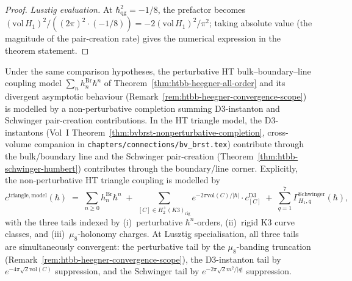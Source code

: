 \begin{proof}
\emph{Lusztig evaluation.} At $\hbar_{\mathrm{qg}}^2 = -1/8$, the
prefactor becomes $(\mathrm{vol}\,H_1)^2/((2\pi)^2\cdot(-1/8)) =
-2(\mathrm{vol}\,H_1)^2/\pi^2$; taking absolute value (the magnitude
of the pair-creation rate) gives the numerical expression in the
theorem statement.
\end{proof}

\begin{remark}
\label{rem:htbb-nonpert-triangle}
Under the same comparison hypotheses, the perturbative HT
bulk--boundary--line coupling model
$\sum_n h_n^{\mathrm{Br}}\hbar^n$ of
Theorem~\ref{thm:htbb-heegner-all-order} and its divergent asymptotic
behaviour (Remark~\ref{rem:htbb-heegner-convergence-scope}) is
modelled by a non-perturbative completion summing D$3$-instanton and
Schwinger pair-creation contributions. In the HT triangle model, the
D$3$-instantons (Vol~I
Theorem~\ref{thm:bvbrst-nonperturbative-completion},
cross-volume companion in
\texttt{chapters/connections/bv\_brst.tex}) contribute through the
bulk/boundary line and the Schwinger pair-creation
(Theorem~\ref{thm:htbb-schwinger-humbert}) contributes through the
boundary/line corner. Explicitly, the non-perturbative HT triangle
coupling is modelled by
\begin{equation}\label{eq:htbb-nonpert-triangle}
 c^{\mathrm{triangle, model}}(\hbar)
 \;=\; \sum_{n\geq 0}h_n^{\mathrm{Br}}\hbar^n
 \;+\;\!\!\sum_{[C]\in H_2^+(K3)_{\mathrm{rig}}}\!\!
 e^{-2\pi\mathrm{vol}(C)/|\hbar|}\cdot c^{\mathrm{D3}}_{[C]}
 \;+\; \sum_{q = 1}^{7}\Gamma^{\mathrm{Schwinger}}_{H_1, q}(\hbar),
\end{equation}
with the three tails indexed by (i)~perturbative $\hbar^n$-orders,
(ii)~rigid K$3$ curve classes, and (iii)~$\mu_8$-holonomy charges.
At Lusztig specialisation, all three tails are simultaneously
convergent: the perturbative tail by the $\mu_8$-banding truncation
(Remark~\ref{rem:htbb-heegner-convergence-scope}), the D$3$-instanton
tail by $e^{-4\pi\sqrt 2\mathrm{vol}(C)}$ suppression, and the
Schwinger tail by $e^{-2\pi\sqrt 2 m^2/|q|}$ suppression.
\end{remark}

